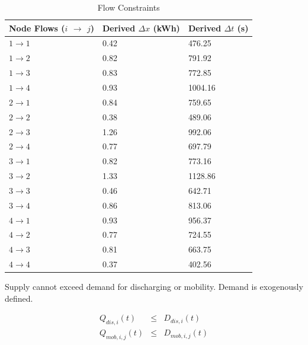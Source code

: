 \documentclass[journal]{IEEEtran}
\begin{document}
\begin{table}[!ht]
    \renewcommand{\arraystretch}{1}
    \caption{Flow Constraints}
    \label{tab:flow constraints}
    \centering
    \def\colmargin{6.75cm}
    \begin{tabular}{lll}
    \hline
    \textbf{Node Flows ($i$ $\rightarrow$ $j$)} & \textbf{Derived} $\Delta x$ (kWh) & \textbf{Derived} $\Delta t$ (s) \\
    \hline
    $1\rightarrow1$ & 0.42  & 476.25  \\
    $1\rightarrow2$ & 0.82  & 791.92  \\
    $1\rightarrow3$ & 0.83  & 772.85  \\
    $1\rightarrow4$ & 0.93  & 1004.16  \\
    $2\rightarrow1$ & 0.84  & 759.65  \\
    $2\rightarrow2$ & 0.38  & 489.06  \\
    $2\rightarrow3$ & 1.26  & 992.06  \\
    $2\rightarrow4$ & 0.77  & 697.79  \\
    $3\rightarrow1$ & 0.82  & 773.16  \\
    $3\rightarrow2$ & 1.33  & 1128.86  \\
    $3\rightarrow3$ & 0.46  & 642.71  \\
    $3\rightarrow4$ & 0.86  & 813.06  \\
    $4\rightarrow1$ & 0.93  & 956.37  \\
    $4\rightarrow2$ & 0.77  & 724.55  \\
    $4\rightarrow3$ & 0.81  & 663.75  \\
    $4\rightarrow4$ & 0.37  & 402.56  \\
    \hline
    \end{tabular}
\end{table}


Supply cannot exceed demand for discharging or mobility. Demand is exogenously defined.

\begin{eqnarray*}
   Q_{dis,i}(t) & \le & D_{dis,i}(t) \\
   Q_{mob,i,j}(t) & \le & D_{mob,i,j}(t) \\
\end{eqnarray*}
\end{document}
